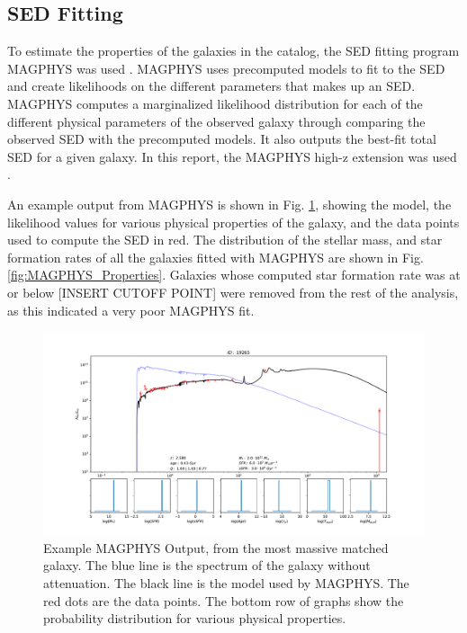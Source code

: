 \subsection{SED Fitting}

To estimate the properties of the galaxies in the catalog, the SED fitting program MAGPHYS was used \cite{da2008simple, da2015alma}. MAGPHYS uses precomputed models to fit to the SED and create likelihoods on the different parameters that makes up an SED. MAGPHYS computes a marginalized likelihood distribution for each of the different physical parameters of the observed galaxy through comparing the observed SED with the precomputed models. It also outputs the best-fit total SED for a given galaxy. In this report, the MAGPHYS high-z extension was used \cite{da2015alma}.

An example output from MAGPHYS is shown in Fig. \ref{fig:MAGPHYS_Example}, showing the model, the likelihood values for various physical properties of the galaxy, and the data points used to compute the SED in red. The distribution of the stellar mass, and star formation rates of all the galaxies fitted with MAGPHYS are shown in Fig. \ref{fig:MAGPHYS_Properties}. Galaxies whose computed star formation rate was at or below [INSERT CUTOFF POINT] were removed from the rest of the analysis, as this indicated a very poor MAGPHYS fit. 

\begin{figure}[tbp]
\centering \includegraphics[width=120mm]{19265.pdf}
\caption{Example MAGPHYS Output, from the most massive matched galaxy. The blue line is the spectrum of the galaxy without attenuation. The black line is the model used by MAGPHYS. The red dots are the data points. The bottom row of graphs show the probability distribution for various physical properties.}
\label{fig:MAGPHYS_Example}
\end{figure}

